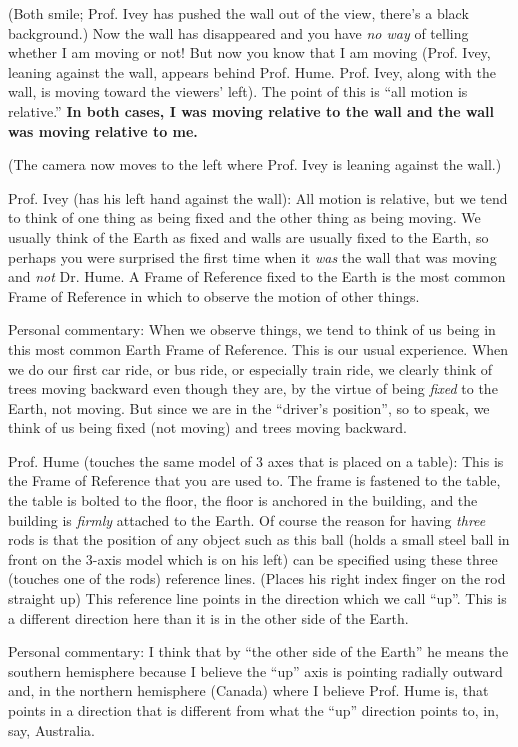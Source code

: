 \documentclass[a6paper]{article}
\begin{document}
(Both smile; Prof. Ivey has pushed the wall out of the view, there's a black background.) Now the wall has disappeared and you have \emph{no way} of telling whether I am moving or not! But now you know that I am moving (Prof. Ivey, leaning against the wall, appears behind Prof. Hume. Prof. Ivey, along with the wall, is moving toward the viewers' left). The point of this is ``all motion is relative.'' \textbf{In both cases, I was moving relative to the wall and the wall was moving relative to me.}

(The camera now moves to the left where Prof. Ivey is leaning against the wall.)

Prof. Ivey (has his left hand against the wall): All motion is relative, but we tend to think of one thing as being fixed and the other thing as being moving. We usually think of the Earth as fixed and walls are usually fixed to the Earth, so perhaps you were surprised the first time when it \emph{was} the wall that was moving and \emph{not} Dr. Hume. A Frame of Reference fixed to the Earth is the most common Frame of Reference in which to observe the motion of other things.

Personal commentary: When we observe things, we tend to think of us being in this most common Earth Frame of Reference. This is our usual experience. When we do our first car ride, or bus ride, or especially train ride, we clearly think of trees moving backward even though they are, by the virtue of being \emph{fixed} to the Earth, not moving. But since we are in the ``driver's position'', so to speak, we think of us being fixed (not moving) and trees moving backward.

Prof. Hume (touches the same model of 3 axes that is placed on a table): This is the Frame of Reference that you are used to. The frame is fastened to the table, the table is bolted to the floor, the floor is anchored in the building, and the building is \emph{firmly} attached to the Earth. Of course the reason for having \emph{three} rods is that the position of any object such as this ball (holds a small steel ball in front on the 3-axis model which is on his left) can be specified using these three (touches one of the rods) reference lines. (Places his right index finger on the rod straight up) This reference line points in the direction which we call ``up''. This is a different direction here than it is in the other side of the Earth.

Personal commentary: I think that by ``the other side of the Earth'' he means the southern hemisphere because I believe the ``up'' axis is pointing radially outward and, in the northern hemisphere (Canada) where I believe Prof. Hume is, that points in a direction that is different from what the ``up'' direction points to, in, say, Australia.
\end{document}
